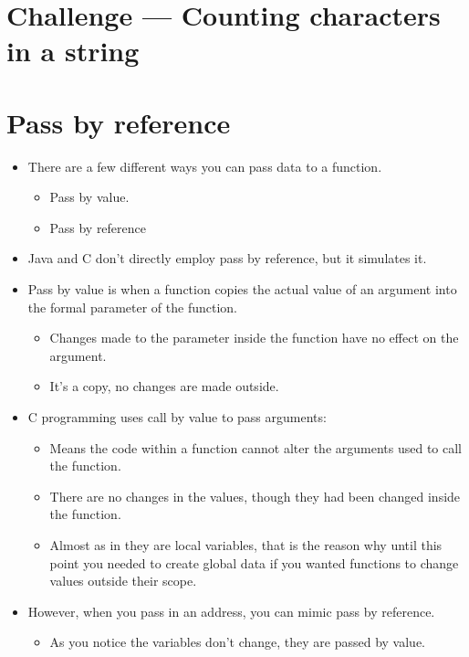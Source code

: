 \section{Challenge — Counting characters in a string}


\section{Pass by reference}
\begin{itemize}
    \item There are a few different ways you can pass data to a function.   
        \begin{itemize}
            \item Pass by value.
            \item Pass by reference
        \end{itemize}
    
    \item Java and C don't directly employ pass by reference, but it simulates it. 
    
    \item Pass by value is when a function copies the actual value of an argument into the formal parameter of the function. 
        \begin{itemize}
            \item Changes made to the parameter inside the function have no effect on the argument. 
            \item It's a copy, no changes are made outside. 
        \end{itemize}
    
    \item C programming uses call by value to pass arguments:
        \begin{itemize}
            \item Means the code within a function cannot alter the arguments used to call the function.
            \item There are no changes in the values, though they had been changed inside the function. 
            \item Almost as in they are local variables, that is the reason why until this point you needed to create global data if you wanted functions to change values outside their scope.  
        \end{itemize}
    
    \item However, when you pass in an address, you can mimic pass by reference.
        \begin{itemize}
            \item As you notice the variables don't change, they are passed by value. 
        \end{itemize}
\end{itemize}

